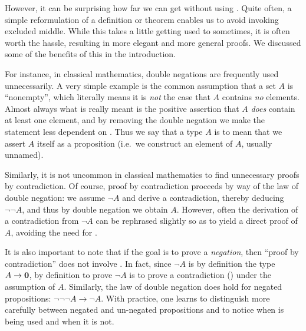 However, it can be surprising how far we can get without using \LEM{}.
Quite often, a simple reformulation of a definition or theorem enables us to avoid invoking excluded middle.
While this takes a little getting used to sometimes, it is often worth the hassle, resulting in more elegant and more general proofs.
We discussed some of the benefits of this in the introduction.

For instance, in classical mathematics, double negations are frequently used unnecessarily.
A very simple example is the common assumption that a set $A$ is ``nonempty'', which literally means it is \emph{not} the case that $A$ contains \emph{no} elements.
Almost always what is really meant is the positive assertion that $A$ \emph{does} contain at least one element, and by removing the double negation we make the statement less dependent on \LEM{}.
Thus we say that a type $A$ is  to mean that we assert $A$ itself as a proposition (i.e.\ we construct an element of $A$, usually unnamed).

Similarly, it is not uncommon in classical mathematics to find unnecessary proofs by contradiction.
Of course, proof by contradiction proceeds by way of the law of double negation: we assume $\neg A$ and derive a contradiction, thereby deducing $\neg \neg A$, and thus by double negation we obtain $A$.
However, often the derivation of a contradiction from $\neg A$ can be rephrased slightly so as to yield a direct proof of $A$, avoiding the need for \LEM{}.

It is also important to note that if the goal is to prove a \emph{negation}, then ``proof by contradiction'' does not involve \LEM{}.
In fact, since $\neg A$ is by definition the type $A\to\mathbf{0}$, by definition to prove $\neg A$ is to prove a contradiction (\emptyt) under the assumption of $A$.
Similarly, the law of double negation does hold for negated propositions: $\neg\neg\neg A \to \neg A$.
With practice, one learns to distinguish more carefully between negated and un-negated propositions and to notice when \LEM{} is being used and when it is not.

